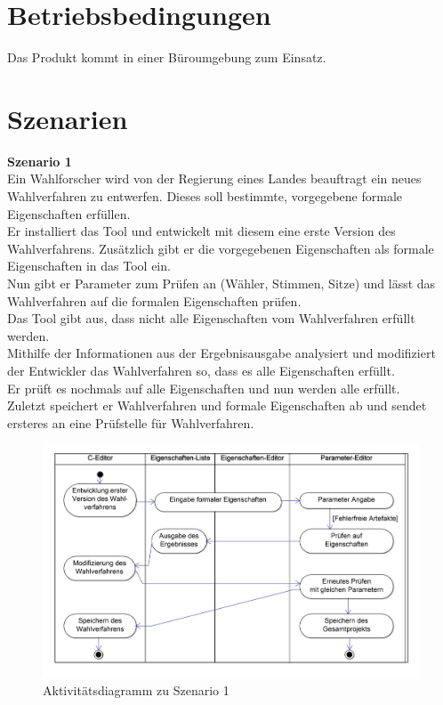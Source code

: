 \documentclass[a4paper]{scrreprt}
\begin{document}
\section{Betriebsbedingungen}
Das Produkt kommt in einer Büroumgebung zum Einsatz.


\section{Szenarien}
\textbf{Szenario 1}\\
Ein Wahlforscher wird von der Regierung eines Landes beauftragt ein neues Wahlverfahren zu entwerfen. Dieses soll bestimmte, vorgegebene formale Eigenschaften erfüllen.\\
Er installiert das Tool und entwickelt mit diesem eine erste Version des Wahlverfahrens. Zusätzlich gibt er die vorgegebenen Eigenschaften als formale Eigenschaften in das Tool ein.\\
Nun gibt er Parameter zum Prüfen an (Wähler, Stimmen, Sitze) und lässt das Wahlverfahren auf die formalen Eigenschaften prüfen.\\
Das Tool gibt aus, dass nicht alle Eigenschaften vom Wahlverfahren erfüllt werden.\\
Mithilfe der Informationen aus der Ergebnisausgabe analysiert und modifiziert der Entwickler das Wahlverfahren so, dass es alle Eigenschaften erfüllt.\\
Er prüft es nochmals auf alle Eigenschaften und nun werden alle erfüllt.\\
Zuletzt speichert er Wahlverfahren und formale Eigenschaften ab und sendet ersteres an eine Prüfstelle für Wahlverfahren.

\begin{figure}[H]
\hspace{-1cm}
\includegraphics[scale=0.12]{ActivityDiagramScenario1.png}
\caption{Aktivitätsdiagramm zu Szenario 1}
\label{Packet-scetch}
\end{figure}
\end{document}
